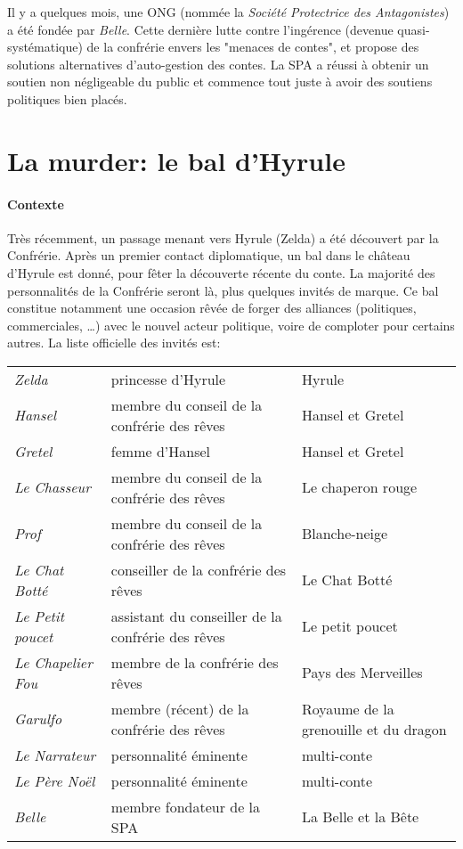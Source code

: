 {{		\par Il y a quelques mois, une ONG (nommée la \emph{Société Protectrice des Antagonistes}) a été fondée par \emph{Belle}. Cette dernière lutte contre l'ingérence (devenue quasi-systématique) de la confrérie envers les "menaces de contes", et propose des solutions alternatives d'auto-gestion des contes. La SPA a réussi à obtenir un soutien non négligeable du public et commence tout juste à avoir des soutiens politiques bien placés.
	}
	
	\section{La murder: le bal d'Hyrule}
	
	\paragraph{Contexte} Très récemment, un passage menant vers Hyrule (Zelda) a été découvert par la Confrérie. Après un premier contact diplomatique, un bal dans le château d'Hyrule est donné, pour fêter la découverte récente du conte. La majorité des personnalités de la Confrérie seront là, plus quelques invités de marque. Ce bal constitue notamment une occasion rêvée de forger des alliances (politiques, commerciales, \dots) avec le nouvel acteur politique, voire de comploter pour certains autres. La liste officielle des invités est:
	\begin{center}
	\begin{tabular}{|l|l|l|}
		\hline
		\emph{Zelda} & princesse d'Hyrule & Hyrule\\
		\emph{Hansel} & membre du conseil de la confrérie des rêves & Hansel et Gretel\\
		\emph{Gretel} & femme d'Hansel & Hansel et Gretel\\
		\emph{Le Chasseur} & membre du conseil de la confrérie des rêves & Le chaperon rouge\\
		\emph{Prof} & membre du conseil de la confrérie des rêves & Blanche-neige\\
		\emph{Le Chat Botté} & conseiller de la confrérie des rêves & Le Chat Botté\\
		\emph{Le Petit poucet} & assistant du conseiller de la confrérie des rêves & Le petit poucet\\
		\emph{Le Chapelier Fou} & membre de la confrérie des rêves & Pays des Merveilles\\
		\emph{Garulfo} & membre (récent) de la confrérie des rêves & Royaume de la grenouille et du dragon\\
		\emph{Le Narrateur} & personnalité éminente & multi-conte\\
		\emph{Le Père Noël} & personnalité éminente & multi-conte\\
		\emph{Belle} & membre fondateur de la SPA & La Belle et la Bête\\
		\hline
	\end{tabular}
	\end{center}
	
}

